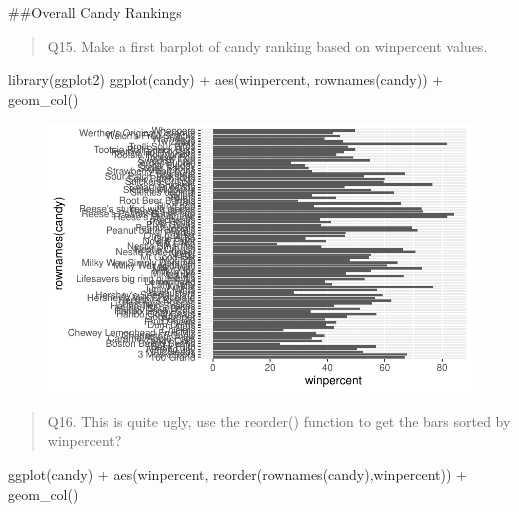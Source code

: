 \documentclass[
  letterpaper,
  DIV=11,
  numbers=noendperiod]{scrartcl}
\newenvironment{Shaded}{\begin{snugshade}}{\end{snugshade}}
\newcommand{\FunctionTok}[1]{\textcolor[rgb]{0.28,0.35,0.67}{#1}}
\newcommand{\NormalTok}[1]{\textcolor[rgb]{0.00,0.23,0.31}{#1}}
\newcommand{\SpecialCharTok}[1]{\textcolor[rgb]{0.37,0.37,0.37}{#1}}
\begin{document}
\#\#Overall Candy Rankings

\begin{quote}
Q15. Make a first barplot of candy ranking based on winpercent values.
\end{quote}

\begin{Shaded}
\begin{Highlighting}[]
\FunctionTok{library}\NormalTok{(ggplot2)}
\FunctionTok{ggplot}\NormalTok{(candy) }\SpecialCharTok{+} 
  \FunctionTok{aes}\NormalTok{(winpercent, }\FunctionTok{rownames}\NormalTok{(candy)) }\SpecialCharTok{+}
  \FunctionTok{geom\_col}\NormalTok{()}
\end{Highlighting}
\end{Shaded}

\begin{figure}[H]

{\centering \includegraphics{class09_files/figure-pdf/unnamed-chunk-16-1.pdf}

}

\end{figure}

\begin{quote}
Q16. This is quite ugly, use the reorder() function to get the bars
sorted by winpercent?
\end{quote}

\begin{Shaded}
\begin{Highlighting}[]
\FunctionTok{ggplot}\NormalTok{(candy) }\SpecialCharTok{+} 
  \FunctionTok{aes}\NormalTok{(winpercent, }\FunctionTok{reorder}\NormalTok{(}\FunctionTok{rownames}\NormalTok{(candy),winpercent)) }\SpecialCharTok{+}
  \FunctionTok{geom\_col}\NormalTok{()}
\end{Highlighting}
\end{Shaded}
\end{document}
